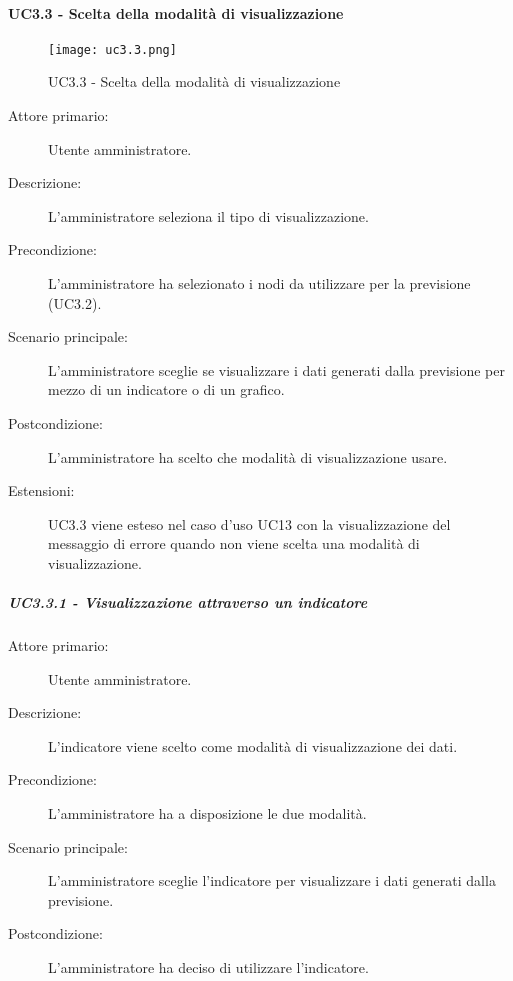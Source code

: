 \paragraph{UC3.3 - Scelta della modalità di visualizzazione}%
\label{sssec:uc3.3}

\begin{figure}[h!]
  \begin{center}
    \texttt{[image: uc3.3.png]}\\
    \caption{UC3.3 - Scelta della modalità di visualizzazione}%
    \label{fig:uc3.3}
  \end{center}
\end{figure}

\begin{description}
  \item[Attore primario:] Utente amministratore.
  \item[Descrizione:] L'amministratore seleziona il tipo di visualizzazione.
  \item[Precondizione:]  L'amministratore ha selezionato i nodi da utilizzare per la previsione (UC3.2).
  \item[Scenario principale:] L'amministratore sceglie se visualizzare i dati generati dalla previsione per mezzo di un indicatore o di un grafico.
  \item[Postcondizione:] L'amministratore ha scelto che modalità di visualizzazione usare.
  \item[Estensioni:] UC3.3 viene esteso nel caso d'uso UC13 con la visualizzazione del messaggio di errore quando non viene scelta una modalità di visualizzazione.
\end{description}

\subparagraph{UC3.3.1 - Visualizzazione attraverso un indicatore}
\label{sssec:uc3.3.1}
\begin{description}
  \item[Attore primario:] Utente amministratore.
  \item[Descrizione:] L'indicatore viene scelto come modalità di visualizzazione dei dati.
  \item[Precondizione:] L'amministratore ha a disposizione le due modalità.
  \item[Scenario principale:] L'amministratore sceglie l'indicatore per visualizzare i dati generati dalla previsione.
  \item[Postcondizione:] L'amministratore ha deciso di utilizzare l'indicatore.
\end{description}

